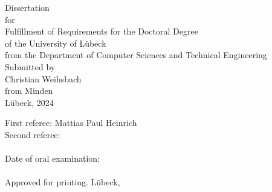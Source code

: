 \begin{titlepage}
\begin{center}
        \vspace*{2.5cm}

        Dissertation\\
        for\\
        Fulfillment of Requirements for the Doctoral Degree\\
        of the University of Lübeck\\[1.0cm]
        from the Department of Computer Sciences and Technical Engineering\\[1.0cm]
        Submitted by\\[0.1cm]
        Christian Weihsbach\\[0.1cm]
        from Minden\\[3.0cm]
        Lübeck, 2024
        \end{center}


    \newpage
    \thispagestyle{empty}

    \addtolength{\topmargin}{1.2cm}
    \addtolength{\textwidth}{-2.35cm}
\end{titlepage}

\begin{titlepage}
    \addtolength{\topmargin}{18cm}
    \noindent First referee: Mattias Paul Heinrich\\
    Second referee:\\\\
    Date of oral examination:\\\\
    Approved for printing. Lübeck,
\end{titlepage}